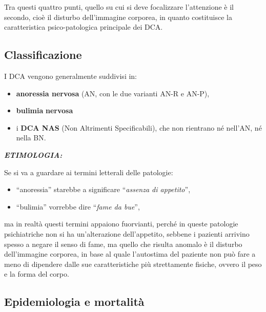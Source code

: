 Tra questi quattro punti, quello su cui si deve focalizzare l'attenzione
è il secondo, cioè il disturbo dell'immagine corporea, in quanto
costituisce la caratteristica psico-patologica principale dei DCA.

\subsection{Classificazione}

I DCA vengono generalmente suddivisi in:

\begin{itemize}
\item
  \textbf{anoressia nervosa} (AN, con le due varianti AN-R e AN-P),
\item
  \textbf{bulimia} \textbf{nervosa}
\item
  i \textbf{DCA NAS} (Non Altrimenti Specificabili), che non rientrano
  né nell'AN, né nella BN.
\end{itemize}

\textbf{\emph{ETIMOLOGIA:}}

Se si va a guardare ai termini letterali delle patologie:

\begin{itemize}
\item
  ``anoressia'' starebbe a significare ``\emph{assenza di appetito}'',
\item
  ``bulimia'' vorrebbe dire ``\emph{fame da bue}'',
\end{itemize}

ma in realtà questi termini appaiono fuorvianti, perché in queste
patologie psichiatriche non si ha un'alterazione dell'appetito, sebbene
i pazienti arrivino spesso a negare il senso di fame, ma quello che
risulta anomalo è il disturbo dell'immagine corporea, in base al quale
l'autostima del paziente non può fare a meno di dipendere dalle sue
caratteristiche più strettamente fisiche, ovvero il peso e la forma del
corpo.

\subsection{Epidemiologia e mortalità}

